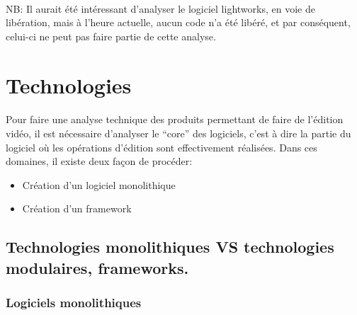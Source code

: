 \paragraph{}

NB: Il aurait été intéressant d'analyser le logiciel lightworks,
en voie de libération, mais à l'heure actuelle, aucun code n'a été
libéré, et par conséquent, celui-ci ne peut pas faire partie de
cette analyse.

\newpage

\section{Technologies}

\paragraph{}

Pour faire une analyse technique des produits permettant de faire
de l'édition vidéo, il est nécessaire d'analyser le ``core'' des
logiciels, c'est à dire la partie du logiciel où les opérations
d'édition sont effectivement réalisées. Dans ces domaines, il existe
deux façon de procéder:

\begin{itemize} \setlength{\itemsep}{2mm}

  \item{Création d'un logiciel monolithique}

  \item{Création d'un framework 
   }

\end{itemize}

\subsection {Technologies monolithiques VS
technologies modulaires, frameworks.}


\subsubsection{Logiciels monolithiques }

